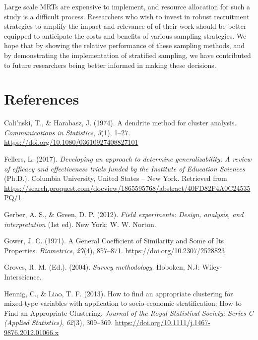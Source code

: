 \documentclass[man,floatsintext]{apa6}
\begin{document}
Large scale MRTs are expensive to implement, and resource allocation for such a study is a difficult process. Researchers who wish to invest in robust recruitment strategies to amplify the impact and relevance of of their work should be better equipped to anticipate the costs and benefits of various sampling strategies. We hope that by showing the relative performance of these sampling methods, and by demonstrating the implementation of stratified sampling, we have contributed to future researchers being better informed in making these decisions.

\hypertarget{references}{%
\section{References}\label{references}}

\begingroup
\setlength{\parindent}{-0.5in}
\setlength{\leftskip}{0.5in}

\hypertarget{refs}{}
\leavevmode\hypertarget{ref-calinskiDendriteMethodCluster1974}{}%
Cali\a'nski, T., \& Harabasz, J. (1974). A dendrite method for cluster analysis. \emph{Communications in Statistics}, \emph{3}(1), 1--27. \url{https://doi.org/10.1080/03610927408827101}

\leavevmode\hypertarget{ref-fellersDevelopingApproachDetermine2017}{}%
Fellers, L. (2017). \emph{Developing an approach to determine generalizability: A review of efficacy and effectiveness trials funded by the Institute of Education Sciences} (Ph.D.). Columbia University, United States -- New York. Retrieved from \url{https://search.proquest.com/docview/1865595768/abstract/40FD82F4A0C24535PQ/1}

\leavevmode\hypertarget{ref-gerberFieldExperimentsDesign2012}{}%
Gerber, A. S., \& Green, D. P. (2012). \emph{Field experiments: Design, analysis, and interpretation} (1st ed). New York: W. W. Norton.

\leavevmode\hypertarget{ref-gowerGeneralCoefficientSimilarity1971}{}%
Gower, J. C. (1971). A General Coefficient of Similarity and Some of Its Properties. \emph{Biometrics}, \emph{27}(4), 857--871. \url{https://doi.org/10.2307/2528823}

\leavevmode\hypertarget{ref-grovesSurveyMethodology2004}{}%
Groves, R. M. (Ed.). (2004). \emph{Survey methodology}. Hoboken, N.J: Wiley-Interscience.

\leavevmode\hypertarget{ref-hennigHowFindAppropriate2013}{}%
Hennig, C., \& Liao, T. F. (2013). How to find an appropriate clustering for mixed-type variables with application to socio-economic stratification: How to Find an Appropriate Clustering. \emph{Journal of the Royal Statistical Society: Series C (Applied Statistics)}, \emph{62}(3), 309--369. \url{https://doi.org/10.1111/j.1467-9876.2012.01066.x}
\end{document}
